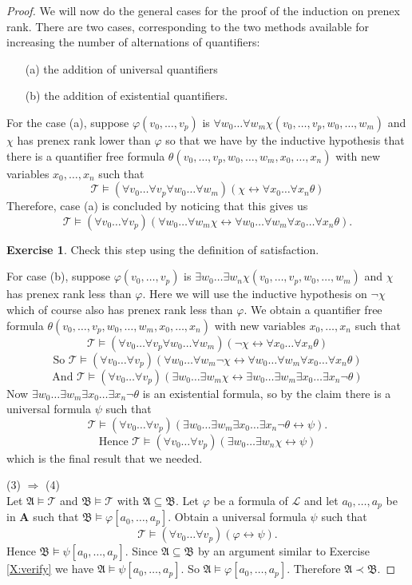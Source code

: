 \documentclass[titlepage, oneside]{amsbook}
\theoremstyle{plain}
\theoremstyle{definition}
\newtheorem{exercise}{Exercise}
\theoremstyle{remark}
\newcommand{\theory}{\ensuremath{\mathcal{T}}}
\newcommand{\ma}{\ensuremath{\mathfrak{A}}}
\newcommand{\mb}{\ensuremath{\mathfrak{B}}}
\newcommand{\allforu}[2]{\ensuremath{\forall #1_{0}  \dots  \forall 
#1_{#2}}}
\newcommand{\frv}[2][0]{\ensuremath{\forall v_{#1} \dots  \forall   
v_{#2}}}
\newcommand{\frw}[2][0]{\ensuremath{\forall w_{#1}  \dots  \forall   
w_{#2}}}
\newcommand{\frx}[2][0]{\ensuremath{\forall x_{#1}  \dots  \forall
x_{#2}}}
\newcommand{\anot}[2][0]{\ensuremath{ a_{#1} , \dots , a_{#2}}}
\newcommand{\vnot}[2][0]{\ensuremath{ v_{#1} , \dots , v_{#2}}}
\newcommand{\wnot}[2][0]{\ensuremath{ w_{#1} , \dots , w_{#2}}}
\newcommand{\xnot}[2][0]{\ensuremath{ x_{#1} , \dots , x_{#2}}}
\newcommand{\amodphi}{\ensuremath{\mathfrak A \models \varphi}}
\newcommand{\amodpsi}{\ensuremath{\mathfrak A \models \psi}}
\newcommand{\bmodphi}{\ensuremath{\mathfrak B \models \varphi}}
\newcommand{\bmodpsi}{\ensuremath{\mathfrak B \models \psi}}
\begin{document}
\begin{proof}
We will now do the general cases for the proof of the induction on
prenex rank.  There are two cases, corresponding to the two methods
available for increasing the number of alternations of quantifiers:
\begin{itemize}
\item[(a)] the addition of universal quantifiers
\item[(b)] the addition of existential quantifiers.
\end{itemize}

For the case (a), suppose $\varphi ( \vnot p )$ is $\frw m \chi
(\vnot{p} , \wnot m )$ and $\chi$ has prenex rank lower than $\varphi$
so that we have by the inductive hypothesis that there is a quantifier
free formula $\theta ( \vnot p , \wnot m , \xnot n )$ with new
variables $\xnot n $ such that \[\theory \models ( \frv p \frw m )
(\chi \leftrightarrow \frx n \theta )\]
Therefore, case (a) is concluded by noticing that this gives us 
 \[\theory \models ( \frv p )(\frw m \chi \leftrightarrow \frw m  \frx
n
\theta ).\]


\begin{exercise}  Check this step using the definition of satisfaction.
\end{exercise}

For case (b), suppose $\varphi ( \vnot p )$ is $\exists w_0 \dots
\exists
w_n \chi ( \vnot p , \wnot m )$ and $\chi$ has prenex rank less than
$\varphi$.  Here we will use the inductive hypothesis on $\neg \chi$
which of course also has prenex rank less than $\varphi$.  We obtain a
quantifier free formula $\theta ( \vnot p , \wnot m , \xnot n )$ with
new variables $\xnot n$ such that 
\[ \theory \models (\frv p \frw m ) ( \neg \chi \leftrightarrow \frx n
\theta ) \]
\[\mbox{So } \theory \models (\frv p )(\frw m  \neg \chi
\leftrightarrow \frw m \frx n
\theta ) \]
\[\mbox{And } \theory \models (\frv p ) ( \exists w_0 \dots \exists 
w_m \chi \leftrightarrow \exists w_0 \dots \exists w_m \exists x_0
\dots \exists x_n \neg \theta ) \]
Now $\exists w_0 \dots \exists w_m \exists x_0 \dots \exists x_n \neg
\theta $ is an existential formula, so by the claim there is a
universal formula $\psi$ such that 
\[\theory \models (\frv p ) ( \exists w_0 \dots \exists w_m \exists x_0
\dots \exists x_n \neg \theta \leftrightarrow \psi ). \]
\[\mbox{Hence } \theory \models (\frv p ) ( \exists w_0 \dots \exists
w_n \chi \leftrightarrow \psi ) \]
which is the final result that we needed.


(3) $\Rightarrow$ (4)\\
 Let $\mathfrak{A} \models \mathcal T$ and
$\mathfrak B \models \mathcal T $ with $\mathfrak A \subseteq \mathfrak B$. 
Let $\varphi$ be a formula of $\mathcal L$ and let $a_0 , \dots , a_p $ be in
$\mathbf A$ such that $ \bmodphi [\anot{p}] $.
Obtain a universal formula $\psi$ such that
 \[ \theory \models (\allforu{v}{p})(\varphi \leftrightarrow \psi) . \]
Hence $\bmodpsi [ \anot{p} ] $. Since $\ma  \subseteq \mb $ by an argument similar to  Exercise \ref{X:verify} we have 
$ \amodpsi    [\anot{p} ] $. So $\amodphi  [ \anot{p} ] $. Therefore  $\ma  \prec \mb $.


\end{proof}
\end{document}
